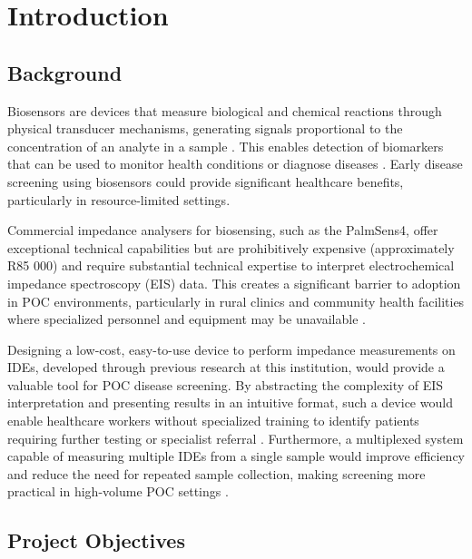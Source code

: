 \graphicspath{{introduction/fig/}}

\chapter{Introduction}
\label{chap:introduction}

\section{Background}

Biosensors are devices that measure biological and chemical reactions through physical transducer mechanisms, generating signals proportional to the concentration of an analyte in a sample \cite{bhallaIntroductionBiosensors2016}. This enables detection of biomarkers that can be used to monitor health conditions or diagnose diseases \cite{BiomarkersNationalInstitute}. Early disease screening using biosensors could provide significant healthcare benefits, particularly in resource-limited settings\cite{chuRecentAdvancesChallenges2021}.

Commercial impedance analysers for biosensing, such as the PalmSens4, offer exceptional technical capabilities but are prohibitively expensive (approximately R85 000) and require substantial technical expertise to interpret electrochemical impedance spectroscopy (EIS) data. This creates a significant barrier to adoption in \ac{POC} environments, particularly in rural clinics and community health facilities where specialized personnel and equipment may be unavailable \cite{pariharPointofcareBiosensorsInfectious}.

Designing a low-cost, easy-to-use device to perform impedance measurements on \acp{IDE}, developed through previous research at this institution, would provide a valuable tool for POC disease screening. By abstracting the complexity of EIS interpretation and presenting results in an intuitive format, such a device would enable healthcare workers without specialized training to identify patients requiring further testing or specialist referral \cite{pariharPointofcareBiosensorsInfectious}. Furthermore, a multiplexed system capable of measuring multiple \acp{IDE} from a single sample would improve efficiency and reduce the need for repeated sample collection, making screening more practical in high-volume \ac{POC} settings \cite{pariharPointofcareBiosensorsInfectious}.

\section{Project Objectives}

